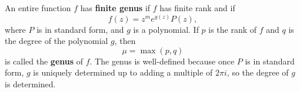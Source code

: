 An entire function $f$ has \textbf{finite genus} if $f$ has finite rank and if
$$f(z) = z^m e^{g(z)} P(z),$$
where $P$ is in standard form, and $g$ is a polynomial. If $p$ is the rank of $f$ and $q$ is the degree of the polynomial $g$, then
$$\mu = \max(p, q)$$
is called the \textbf{genus} of $f$. The genus is well-defined because once $P$ is in standard form, $g$ is uniquely determined up to adding a multiple of $2\pi i$, so the degree of $g$ is determined.
